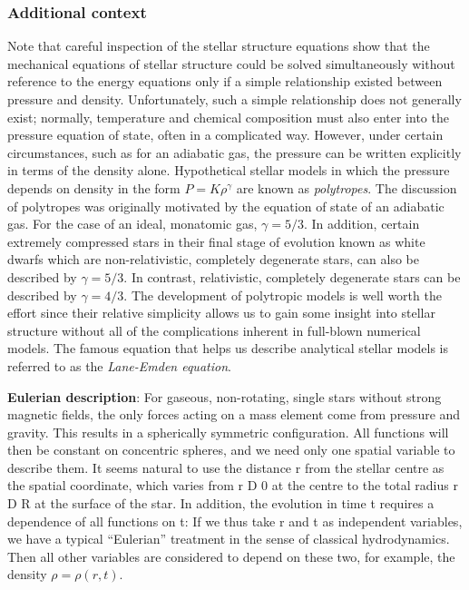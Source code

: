 \documentclass[a4paper,10pt]{article}
\begin{document}
\subsubsection{Additional context}

Note that careful inspection of the stellar structure equations show that the mechanical equations of stellar structure could be solved simultaneously without reference to the energy equations only if a simple relationship existed between pressure and density. Unfortunately, such a simple relationship does not generally exist; normally, temperature and chemical composition must also enter into the pressure equation of state, often in a complicated way. However, under certain circumstances, such as for an adiabatic gas, the pressure can be written explicitly in terms of the density alone. Hypothetical stellar models in which the pressure depends on density in the form $P=K\rho^\gamma$ are known as \textit{polytropes}. The discussion of polytropes was originally motivated by the equation of state of an adiabatic gas. For the case of an ideal, monatomic gas, $\gamma=5/3$. In addition, certain extremely compressed stars in their final stage of evolution known as white dwarfs which are non-relativistic, completely degenerate stars, can also be described by $\gamma=5/3$. In contrast, relativistic, completely degenerate stars can be described by $\gamma=4/3$. The development of polytropic models is well worth the effort since their relative simplicity allows us to gain some insight into stellar structure without all of the complications inherent in full-blown numerical models. The famous equation that helps us describe analytical stellar models is referred to as the \textit{Lane-Emden equation}.

{\noindent}\textbf{Eulerian description}: For gaseous, non-rotating, single stars without strong magnetic fields, the only forces acting on a mass element come from pressure and gravity. This results in a spherically symmetric configuration. All functions will then be constant on concentric spheres, and we need only one spatial variable to describe them. It seems natural to use the distance r from the stellar centre as the spatial coordinate, which varies from r D 0 at the centre to the total radius r D R at the surface of the star. In addition, the evolution in time t requires a dependence of all functions on t: If we thus take r and t as independent variables, we have a typical ``Eulerian'' treatment in the sense of classical hydrodynamics. Then all other variables are considered to depend on these two, for example, the density $\rho=\rho(r,t)$.
\end{document}
